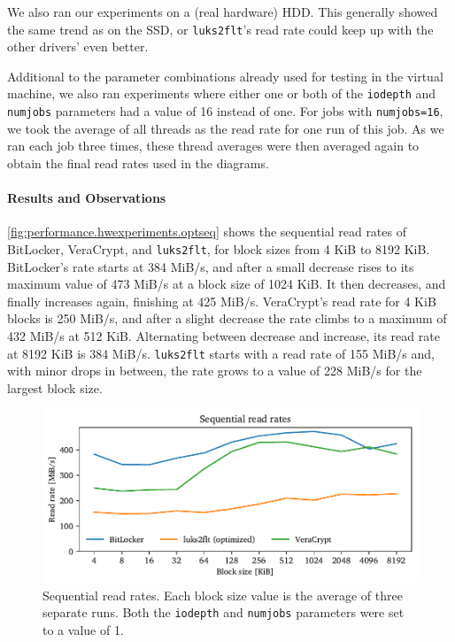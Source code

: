 We also ran our experiments on a (real hardware) HDD. This generally showed the same trend as on the SSD, or \texttt{luks2flt}'s read rate could keep up with the other drivers' even better.

Additional to the parameter combinations already used for testing in the virtual machine, we also ran experiments where either one or both of the \texttt{iodepth} and \texttt{numjobs} parameters had a value of 16 instead of one. For jobs with \texttt{numjobs=16}, we took the average of all threads as the read rate for one run of this job. As we ran each job three times, these thread averages were then averaged again to obtain the final read rates used in the diagrams.

\paragraph{Results and Observations}
\autoref{fig:performance.hwexperiments.optseq} shows the sequential read rates of BitLocker, VeraCrypt, and \texttt{luks2flt}, for block sizes from 4 KiB to 8192 KiB. BitLocker's rate starts at 384 MiB/s, and after a small decrease rises to its maximum value of 473 MiB/s at a block size of 1024 KiB. It then decreases, and finally increases again, finishing at 425 MiB/s. VeraCrypt's read rate for 4 KiB blocks is 250 MiB/s, and after a slight decrease the rate climbs to a maximum of 432 MiB/s at 512 KiB. Alternating between decrease and increase, its read rate at 8192 KiB is 384 MiB/s. \texttt{luks2flt} starts with a read rate of 155 MiB/s and, with minor drops in between, the rate grows to a value of 228 MiB/s for the largest block size.

\begin{figure}[htb!]
	\center
	\includegraphics[scale=1]{../fig/performance.hwexperiments.optseq.pdf}
	\caption[
		Sequential read rates
	]{
		Sequential read rates. Each block size value is the average of three separate runs. Both the \texttt{iodepth} and \texttt{numjobs} parameters were set to a value of 1.
	}
	\label{fig:performance.hwexperiments.optseq}
\end{figure}

